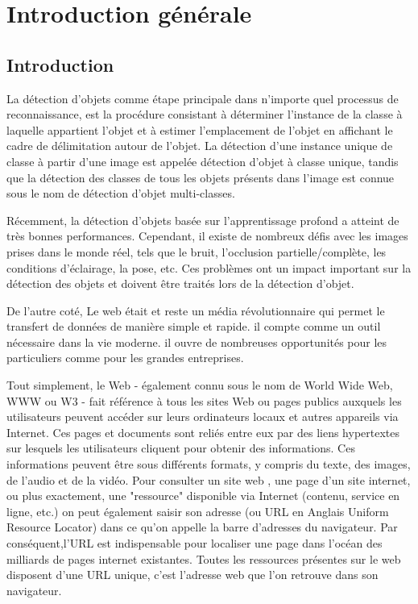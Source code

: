 \chapter*{Introduction générale}
\newpage
\pagestyle{fancy}
\fancyhead[L]{}
\renewcommand{\headrulewidth}{1pt}
\fancyfoot[C]{\thepage}


\section*{Introduction}
La détection d'objets comme étape principale dans n'importe quel processus  de reconnaissance, est la procédure consistant à déterminer l'instance de la classe à laquelle appartient l'objet et à estimer l'emplacement de l'objet en affichant le cadre de délimitation autour de l'objet. La détection d'une instance unique de classe à partir d'une image est appelée détection d'objet à classe unique, tandis que la détection des classes de tous les objets présents dans l'image est connue sous le nom de détection d'objet multi-classes. 

Récemment, la détection d'objets basée sur l'apprentissage profond a atteint de très bonnes performances. Cependant, il existe de nombreux défis avec les images prises dans le monde réel, tels que le bruit, l'occlusion partielle/complète, les conditions d'éclairage, la pose, etc. Ces problèmes ont un impact important sur la détection des objets et doivent être traités lors de la détection d'objet. 

De l'autre coté, Le web était et reste un média révolutionnaire qui permet le transfert de données de manière simple et rapide. il compte comme un outil nécessaire dans la vie moderne. il ouvre de nombreuses opportunités pour les particuliers comme pour les grandes entreprises. 

Tout simplement, le Web - également connu sous le nom de World Wide Web, WWW ou W3 - fait référence à tous les sites Web ou pages publics auxquels les utilisateurs peuvent accéder sur leurs ordinateurs locaux et autres appareils via Internet. Ces pages et documents sont reliés entre eux par des liens hypertextes sur lesquels les utilisateurs cliquent pour obtenir des informations. Ces informations peuvent être sous différents formats, y compris du texte, des images, de l'audio et de la vidéo.
Pour consulter un site web , une page d'un site internet, ou plus exactement, une "ressource" disponible via Internet (contenu, service en ligne, etc.) on peut également saisir son adresse (ou URL en Anglais Uniform Resource Locator) dans ce qu’on appelle la barre d'adresses du navigateur. Par conséquent,l'URL est indispensable pour localiser une page dans l'océan des milliards de pages internet existantes.  Toutes les ressources présentes sur le web disposent d'une URL unique, c'est l'adresse web que l'on retrouve dans son navigateur.

